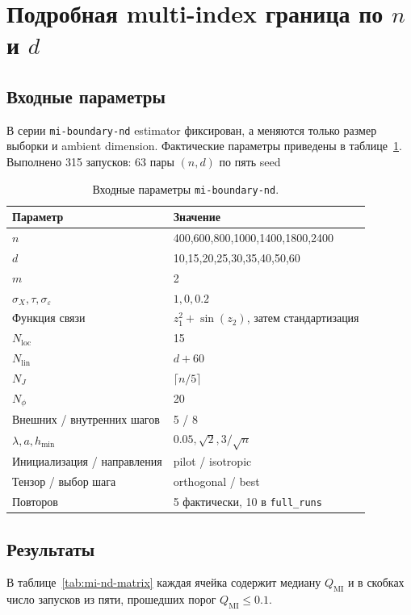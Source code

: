\documentclass[11pt,a4paper]{article}
\newcommand{\code}[1]{\texttt{#1}}
\newcommand{\qmi}{Q_{\mathrm{MI}}}
\begin{document}
\section{Подробная multi-index граница по
\texorpdfstring{$n$ и $d$}{n и d}}

\subsection{Входные параметры}

В серии \code{mi-boundary-nd} estimator фиксирован, а меняются только размер
выборки и ambient dimension. Фактические параметры приведены в
таблице~\ref{tab:mi-nd-inputs}. Выполнено 315 запусков: 63 пары $(n,d)$ по
пять seed

\begin{table}[ht]
\centering
\small
\begin{tabular}{l|l}
\hline
Параметр & Значение \\
\hline
$n$ & 400,600,800,1000,1400,1800,2400 \\
$d$ & 10,15,20,25,30,35,40,50,60 \\
$m$ & 2 \\
$\sigma_X,\tau,\sigma_\varepsilon$ & $1,0,0.2$ \\
Функция связи & $z_1^2+\sin(z_2)$, затем стандартизация \\
$N_{\mathrm{loc}}$ & 15 \\
$N_{\mathrm{lin}}$ & $d+60$ \\
$N_J$ & $\lceil n/5\rceil$ \\
$N_\phi$ & 20 \\
Внешних / внутренних шагов & 5 / 8 \\
$\lambda,a,h_{\min}$ & $0.05,\sqrt2,3/\sqrt n$ \\
Инициализация / направления & pilot / isotropic \\
Тензор / выбор шага & orthogonal / best \\
Повторов & 5 фактически, 10 в \code{full\_runs} \\
\hline
\end{tabular}
\caption{Входные параметры \code{mi-boundary-nd}.}
\label{tab:mi-nd-inputs}
\end{table}

\subsection{Результаты}

В таблице~\ref{tab:mi-nd-matrix} каждая ячейка содержит медиану $\qmi$ и в
скобках число запусков из пяти, прошедших порог $\qmi\leq0.1$.
\end{document}

